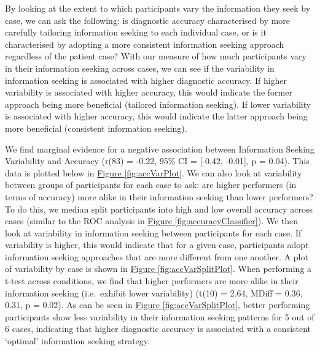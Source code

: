 \documentclass[a4paper, nobind]{templates/ociamthesis}
\begin{document}
By looking at the extent to which participants vary the information they seek by case, we can ask the following: is diagnostic accuracy characterised by more carefully tailoring information seeking to each individual case, or is it characterised by adopting a more consistent information seeking approach regardless of the patient case? With our measure of how much participants vary in their information seeking across cases, we can see if the variability in information seeking is associated with higher diagnostic accuracy. If higher variability is associated with higher accuracy, this would indicate the former approach being more beneficial (tailored information seeking). If lower variability is associated with higher accuracy, this would indicate the latter approach being more beneficial (consistent information seeking).

\hfill\break
We find marginal evidence for a negative association between Information Seeking Variability and Accuracy (r(83) = -0.22, 95\% CI = {[}-0.42, -0.01{]}, p = 0.04). This data is plotted below in \hyperref[fig:accVarPlot]{Figure \ref{fig:accVarPlot}}. We can also look at variability between groups of participants for each case to ask: are higher performers (in terms of accuracy) more alike in their information seeking than lower performers? To do this, we median split participants into high and low overall accuracy across cases (similar to the ROC analysis in \hyperref[fig:accuracyClassifier]{Figure \ref{fig:accuracyClassifier}}). We then look at variability in information seeking between participants for each case. If variability is higher, this would indicate that for a given case, participants adopt information seeking approaches that are more different from one another. A plot of variability by case is shown in \hyperref[fig:accVarSplitPlot]{Figure \ref{fig:accVarSplitPlot}}. When performing a t-test across conditions, we find that higher performers are more alike in their information seeking (i.e.~exhibit lower variability) (t(10) = 2.64, MDiff = 0.36, 0.31, p = 0.02). As can be seen in \hyperref[fig:accVarSplitPlot]{Figure \ref{fig:accVarSplitPlot}}, better performing participants show less variability in their information seeking patterns for 5 out of 6 cases, indicating that higher diagnostic accuracy is associated with a consistent `optimal' information seeking strategy.
\end{document}
